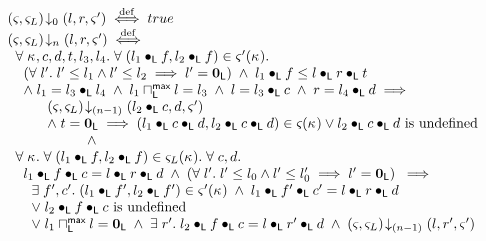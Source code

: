\begin{definition}
\[\begin{array}{l}
	
	\left(\varsigma_{}, \varsigma_{L}\right) \!\downarrow_{0} \left(l, r, \varsigma_{}'\right) \stackrel{\mathrm{def}}{\iff} true \\ 
	
	\left(\varsigma_{}, \varsigma_{L}\right) \!\downarrow_{n} \left(l, r, \varsigma_{}'\right) \stackrel{\mathrm{def}}{\iff} \\ 

	\hspace*{0.2cm}\forall\; \kappa_{}, c, d, t, l_3, l_4.\;\forall\; (l_1 \bullet_{\textsf{L}} f, l_2 \bullet_{\textsf{L}} f) \in \varsigma_{}'(\kappa_{}).\; \\
	\hspace*{0.4cm}\left(\forall\; l'.\; l' \leq l_1 \land l' \leq l_2 \implies l' = \mathbf{0}_{\textsf{L}}\right) \;\land\; l_1 \bullet_{\textsf{L}} f \leq  l \bullet_{\textsf{L}} r \bullet_{\textsf{L}} t \\
	\hspace*{0.4cm} \land\; l_1 = l_3 \bullet_{\textsf{L}} l_4 \;\land\; l_1 \sqcap_{\textsf{L}}^{\textsf{max}} l = l_3 \;\land\; l = l_3 \bullet_{\textsf{L}} c \;\land\; r = l_4 \bullet_{\textsf{L}} d \implies\\
	\hspace*{1cm} \left(\varsigma_{}, \varsigma_{L}\right) \!\downarrow_{(n-1)} \left(l_2 \bullet_{\textsf{L}} c, d, \varsigma_{}'\right)\\
	\hspace*{1cm}\land\; t = \mathbf{0}_{\textsf{L}} \implies (l_1 \bullet_{\textsf{L}} c \bullet_{\textsf{L}} d, l_2 \bullet_{\textsf{L}} c \bullet_{\textsf{L}} d) \in \varsigma_{}(\kappa_{}) \lor l_2 \bullet_{\textsf{L}} c \bullet_{\textsf{L}} d \text{ is undefined} \\
	
		\hspace*{2cm} \land\\
	

  \hspace*{0.2cm}\forall\; \kappa_{}.\; \forall\; (l_1 \bullet_{\textsf{L}} f, l_2 \bullet_{\textsf{L}} f) \in \varsigma_{L}(\kappa_{}).\; \forall\; c, d.\; \\
  \hspace*{0.4cm} l_1 \bullet_{\textsf{L}} f \bullet_{\textsf{L}} c = l \bullet_{\textsf{L}} r \bullet_{\textsf{L}} d \;\land\; \left(\forall\; l'.\; l' \leq l_0 \land l' \leq l'_0 \implies l' = \mathbf{0}_{\textsf{L}}\right)  \;\implies\\
  \hspace*{0.6cm}\exists\; f', c'.\; (l_1 \bullet_{\textsf{L}} f', l_2 \bullet_{\textsf{L}} f') \in \varsigma_{}'(\kappa_{}) \;\land\; l_1 \bullet_{\textsf{L}} f' \bullet_{\textsf{L}} c' =  l \bullet_{\textsf{L}} r \bullet_{\textsf{L}} d\\
	

		\hspace*{0.6cm}\lor\;l_2 \bullet_{\textsf{L}} f \bullet_{\textsf{L}} c \text{ is undefined}\\
		\hspace*{0.6cm}\lor\; l_1 \sqcap_{\textsf{L}}^{\textsf{max}} l = \mathbf{0}_{\textsf{L}} \;\land\; \exists\; r'.\; l_2 \bullet_{\textsf{L}} f \bullet_{\textsf{L}} c = l \bullet_{\textsf{L}} r' \bullet_{\textsf{L}} d \;\land\; \left(\varsigma_{}, \varsigma_{L}\right) \!\downarrow_{(n-1)} \left(l, r', \varsigma_{}'\right)

\end{array}
\]
%
%
\end{definition}
